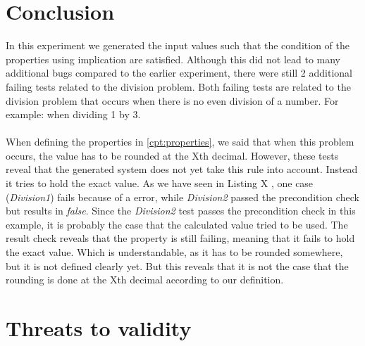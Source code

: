 \section{Conclusion}
In this experiment we generated the input values such that the condition of the properties using implication are satisfied. Although this did not lead to many additional bugs compared to the earlier experiment, there were still 2 additional failing tests related to the division problem. Both failing tests are related to the division problem that occurs when there is no even division of a number. For example: when dividing 1 by 3.\\
\\
When defining the properties in \autoref{cpt:properties}, we said that when this problem occurs, the value has to be rounded at the Xth  decimal. However, these tests reveal that the generated system does not yet take this rule into account. Instead it tries to hold the exact value. As we have seen in Listing X , one case (\textit{Division1}) fails because of a  error, while \textit{Division2} passed the precondition check but results in \textit{false}. Since the \textit{Division2} test passes the precondition check in this example, it is probably the case that the calculated value tried to be used. The result check reveals that the property is still failing, meaning that it fails to hold the exact value. Which is understandable, as it has to be rounded somewhere, but it is not defined clearly yet. But this reveals that it is not the case that the rounding is done at the Xth  decimal according to our definition.

\section{Threats to validity}

